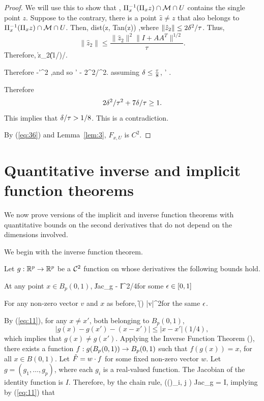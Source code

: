 \documentclass[final, 12pt]{colt2018} %
\begin{document}
\begin{proof}
We will use this to show that , $\Pi_x^{-1}(\Pi_x z) \cap \mathcal M \cap U$ contains the single point $z$.
Suppose to the contrary, there is a point $\hat z \neq z$ that also belongs to  $ \Pi_x^{-1}(\Pi_x z) \cap \mathcal M \cap U$. Then, \beq dist(\hat z, Tan(z)) \leq {},\eeq where $\|\hat z_2\| \leq 2 {\mathbf{\delta}}^2/\tau$. Thus, $$\|\hat z_2\| \leq \frac{\|\hat z_2\|^2 \|I+ A A^T\|^{1/2}}{\tau}.$$ Therefore,
 \leq \|\hat z_2\|(1/)/\tau \leq {}. \eeq


Therefore -\de'^2 \leq {},\eeq and so 
\beq \de'  - 2\de^2/\tau^2. \eeq
assuming ${\mathbf{\delta}} \leq \frac{\tau}{8}$, 
\beq \de' \leq \frac{7\de}{\tau}. \eeq

Therefore $$2 {\mathbf{\delta}}^2/\tau^2 + 7{\mathbf{\delta}}/\tau \geq 1.$$ This implies that ${\mathbf{\delta}} /\tau > 1/8$. This is a contradiction.

By (\ref{eq:36}) and Lemma~\ref{lem:3}, $F_{x, U}$ is $C^2$.
\end{proof}


\section{Quantitative inverse and implicit function theorems}
We now prove versions of the implicit and inverse function theorems with quantitative bounds on the second derivatives that do not depend on the dimensions involved.

We begin with the inverse function theorem.

Let $g: \mathbb R^p \rightarrow \mathbb R^p$ be a $\mathcal{C}^2$ function on whose derivatives the following bounds hold.

At any point $x \in B_p(0, 1)$, \beq{}\|Jac_g - I\| \leq \eps^2/4\eeq for some ${\epsilon} \in [0, 1]$

For any non-zero vector $v$ and $x$ as before, \beq{}\left\|\right\| \leq \left(\right) |v|^2\eeq for the same ${\epsilon}$.

By (\ref{eq:11}), for any $x \neq x'$, both belonging to $B_p(0, 1)$, $$|g(x) - g(x') - (x - x')| \leq |x-x'| (1/4),$$ which implies that $g(x) \neq g(x')$. Applying the Inverse Function Theorem (\cite{Narasimhan}), 
there exists a function $f: g(B_p(0, 1)) \rightarrow B_p(0, 1)$ such that 
$f(g(x)) = x$, for all $x \in B(0, 1)$. Let $\hat{F} = w\cdot f$ for some fixed non-zero vector $w$. Let $g = (g_1, \dots, g_p)$, where each $g_i$ is a real-valued function. The Jacobian of the identity function is $I$. Therefore, by the chain rule,
\beq {} \left(\left(\right)_{i, j \in [p]}\right) Jac_g = I, \eeq implying by (\ref{eq:11}) that
\end{document}
